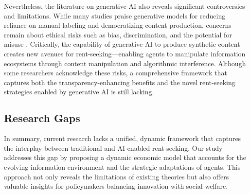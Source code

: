 Nevertheless, the literature on generative AI also reveals significant controversies and limitations. While many studies praise generative models for reducing reliance on manual labeling and democratizing content production, concerns remain about ethical risks such as bias, discrimination, and the potential for misuse \citep{weidinger2022taxonomy, vinuesa2020role}. Critically, the capability of generative AI to produce synthetic content creates new avenues for rent-seeking—enabling agents to manipulate information ecosystems through content manipulation and algorithmic interference. Although some researchers acknowledge these risks, a comprehensive framework that captures both the transparency-enhancing benefits and the novel rent-seeking strategies enabled by generative AI is still lacking.

\subsection{Research Gaps}

In summary, current research lacks a unified, dynamic framework that captures the interplay between traditional and AI-enabled rent-seeking. Our study addresses this gap by proposing a dynamic economic model that accounts for the evolving information environment and the strategic adaptations of agents. This approach not only reveals the limitations of existing theories but also offers valuable insights for policymakers balancing innovation with social welfare.